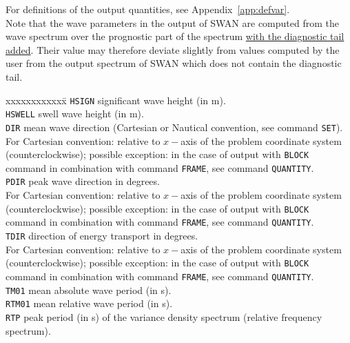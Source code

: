 \documentclass[12pt]{book}
\begin{document}
\noindent
For definitions of the output quantities, see Appendix~\ref{app:defvar}.
\\[2ex]
Note that the wave parameters in the output of SWAN are computed from the wave spectrum over the prognostic part of the spectrum
\underline{with the diagnostic tail added}. Their value may therefore deviate slightly from values computed by the user from the
output spectrum of SWAN which does not contain the diagnostic tail.

\begin{tabbing}
 xxxxxxxxxxxx\= \kill
{\tt HSIGN}  \> significant wave height (in m).\\
{\tt HSWELL} \> swell wave height (in m).\\
{\tt DIR}    \> mean wave direction (Cartesian or Nautical convention, see command {\tt SET}).\+\\
                For Cartesian convention: relative to $x-$axis of the problem coordinate system\\
                (counterclockwise); possible exception: in the case of output with {\tt BLOCK}\\
                command in combination with command {\tt FRAME}, see command {\tt QUANTITY}.\-\\
{\tt PDIR}   \> peak wave direction in degrees.\+\\
                For Cartesian convention: relative to $x-$axis of the problem coordinate system\\
                (counterclockwise); possible exception: in the case of output with {\tt BLOCK}\\
                command in combination with command {\tt FRAME}, see command {\tt QUANTITY}.\-\\
{\tt TDIR}   \> direction of energy transport in degrees.\+\\
                For Cartesian convention: relative to $x-$axis of the problem coordinate system\\
                (counterclockwise); possible exception: in the case of output with {\tt BLOCK}\\
                command in combination with command {\tt FRAME}, see command {\tt QUANTITY}.\-\\
{\tt TM01}   \> mean absolute wave period (in s).\\
{\tt RTM01}  \> mean relative wave period (in s).\\
{\tt RTP}    \> peak period (in s) of the variance density spectrum (relative frequency spectrum).\\

\end{tabbing}
\end{document}
